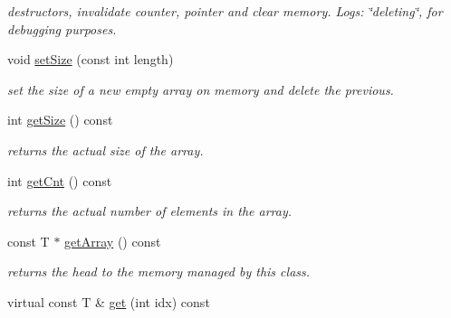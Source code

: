 \begin{DoxyCompactItemize}
\begin{DoxyCompactList}\small\item\em destructors, invalidate counter, pointer and clear memory. Logs\-: \char`\"{}deleting\char`\"{}, for debugging purposes. \end{DoxyCompactList}\item 
\hypertarget{classparray_1_1PointerArray_ae3fb455ddc80180a3a7b130cb2c4d903}{void \hyperlink{classparray_1_1PointerArray_ae3fb455ddc80180a3a7b130cb2c4d903}{set\-Size} (const int length)}\label{classparray_1_1PointerArray_ae3fb455ddc80180a3a7b130cb2c4d903}

\begin{DoxyCompactList}\small\item\em set the size of a new empty array on memory and delete the previous. \end{DoxyCompactList}\item 
\hypertarget{classparray_1_1PointerArray_ac676a9ef1cc04a9aab5f9b744142bf61}{int \hyperlink{classparray_1_1PointerArray_ac676a9ef1cc04a9aab5f9b744142bf61}{get\-Size} () const }\label{classparray_1_1PointerArray_ac676a9ef1cc04a9aab5f9b744142bf61}

\begin{DoxyCompactList}\small\item\em returns the actual size of the array. \end{DoxyCompactList}\item 
\hypertarget{classparray_1_1PointerArray_ac6ad9597cf9fb62857a143e3c241223e}{int \hyperlink{classparray_1_1PointerArray_ac6ad9597cf9fb62857a143e3c241223e}{get\-Cnt} () const }\label{classparray_1_1PointerArray_ac6ad9597cf9fb62857a143e3c241223e}

\begin{DoxyCompactList}\small\item\em returns the actual number of elements in the array. \end{DoxyCompactList}\item 
\hypertarget{classparray_1_1PointerArray_ac2fc7fd12afb0d8fa908ad02a3e39d28}{const T $\ast$ \hyperlink{classparray_1_1PointerArray_ac2fc7fd12afb0d8fa908ad02a3e39d28}{get\-Array} () const }\label{classparray_1_1PointerArray_ac2fc7fd12afb0d8fa908ad02a3e39d28}

\begin{DoxyCompactList}\small\item\em returns the head to the memory managed by this class. \end{DoxyCompactList}\item 
\hypertarget{classparray_1_1PointerArray_a97dbb10226a33da7823685fafe609194}{virtual const T \& \hyperlink{classparray_1_1PointerArray_a97dbb10226a33da7823685fafe609194}{get} (int idx) const }\label{classparray_1_1PointerArray_a97dbb10226a33da7823685fafe609194}


\end{DoxyCompactItemize}
